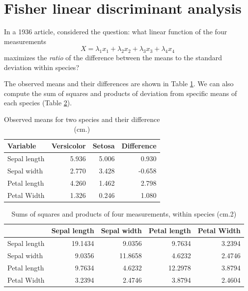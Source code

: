 \documentclass[aoas]{imsart}
\numberwithin{equation}{section}
\theoremstyle{plain}
\theoremstyle{remark}
\begin{document}
\hypertarget{fisher-linear-discriminant-analysis}{%
\section{Fisher linear discriminant
analysis}\label{fisher-linear-discriminant-analysis}}

In a 1936 article, \citet{fisher1936} considered the question: what
linear function of the four measurements \begin{equation}
X = \lambda_1 x_1 + \lambda_2 x_2 + \lambda_3 x_3 + \lambda_4 x_4
\end{equation} maximizes the \textit{ratio} of the difference between
the means to the standard deviation within species?

The observed means and their differences are shown in Table
\ref{tab:iris_mean}. We can also compute the sum of squares and products
of deviation from specific means of each species (Table
\ref{tab:compute_var}).

\begin{table}[!h]

\caption{\label{tab:iris_mean}Observed means for two species and their difference (cm.)}
\centering
\begin{tabular}[t]{lrrr}
\hline
Variable & Versicolor & Setosa & Difference\\
\hline
Sepal length & 5.936 & 5.006 & 0.930\\
Sepal width & 2.770 & 3.428 & -0.658\\
Petal length & 4.260 & 1.462 & 2.798\\
Petal Width & 1.326 & 0.246 & 1.080\\
\hline
\end{tabular}
\end{table}

\begin{table}[!h]

\caption{\label{tab:compute_var}Sums of squares and products of four measurements, within species (cm.2)}
\centering
\begin{tabular}[t]{lrrrr}
\hline
  & Sepal length & Sepal width & Petal length & Petal Width\\
\hline
Sepal length & 19.1434 & 9.0356 & 9.7634 & 3.2394\\
Sepal width & 9.0356 & 11.8658 & 4.6232 & 2.4746\\
Petal length & 9.7634 & 4.6232 & 12.2978 & 3.8794\\
Petal Width & 3.2394 & 2.4746 & 3.8794 & 2.4604\\
\hline
\end{tabular}
\end{table}
\end{document}

